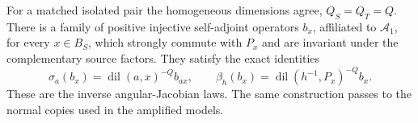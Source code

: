 \begin{proposition}\label{prop:scale-isolated-height}
For a matched isolated pair the homogeneous dimensions agree,
$Q_S=Q_T=Q$.  There is a family of positive injective self-adjoint
operators $b_x$, affiliated to $\mathcal A_1$, for every $x\in B_S$,
which strongly commute with $P_x$ and are invariant under the
complementary source factors.  They satisfy the exact identities
\begin{equation}\label{eq:scale-isolated-height-covariance}
 \sigma_a(b_x)=\operatorname{dil}(a,x)^{-Q}b_{ax},\qquad
 \beta_h(b_x)=\operatorname{dil}(h^{-1},P_x)^{-Q}b_x.
\end{equation}
These are the inverse angular-Jacobian laws.  The same construction
passes to the normal copies used in the amplified models.
\end{proposition}

